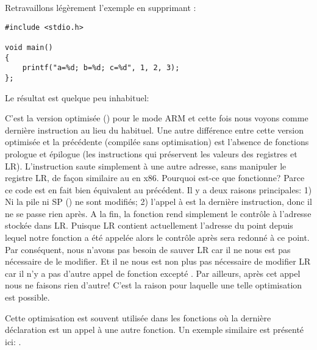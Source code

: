 \label{ARM_B_to_printf}

Retravaillons légèrement l'exemple en supprimant :

\begin{lstlisting}[style=customc]
#include <stdio.h>

void main()
{
	printf("a=%d; b=%d; c=%d", 1, 2, 3);
};
\end{lstlisting}

Le résultat est quelque peu inhabituel:



C'est la version optimisée (\Othree) pour le mode ARM et cette fois nous voyons
 comme dernière instruction au lieu du  habituel.
Une autre différence entre cette version optimisée et la précédente (compilée
sans optimisation) est l'absence de fonctions prologue et épilogue (les instructions
qui préservent les valeurs des registres  et \ac{LR}).
L'instruction  saute simplement à une autre adresse, sans manipuler le registre
\ac{LR}, de façon similaire au \JMP en x86.
Pourquoi est-ce que fonctionne? Parce ce code est en fait bien équivalent au précédent.
Il y a deux raisons principales: 1) Ni la pile ni \ac{SP} ()
ne sont modifiés;
2) l'appel à \printf est la dernière instruction, donc il ne se passe rien après.
A la fin, la fonction \printf rend simplement le contrôle à l'adresse stockée
dans \ac{LR}.
Puisque \ac{LR} contient actuellement l'adresse du point depuis lequel notre fonction
a été appelée alors le contrôle après \printf sera redonné à ce point.
Par conséquent, nous n'avons pas besoin de sauver \ac{LR} car il ne nous est pas
nécessaire de le modifier.
Et il ne nous est non plus pas nécessaire de modifier \ac{LR} car il n'y a pas d'autre
appel de fonction excepté \printf. Par ailleurs, après cet appel nous ne faisons
rien d'autre!
C'est la raison pour laquelle une telle optimisation est possible.

Cette optimisation est souvent utilisée dans les fonctions où la dernière déclaration
est un appel à une autre fonction.
Un exemple similaire est présenté ici:
.


